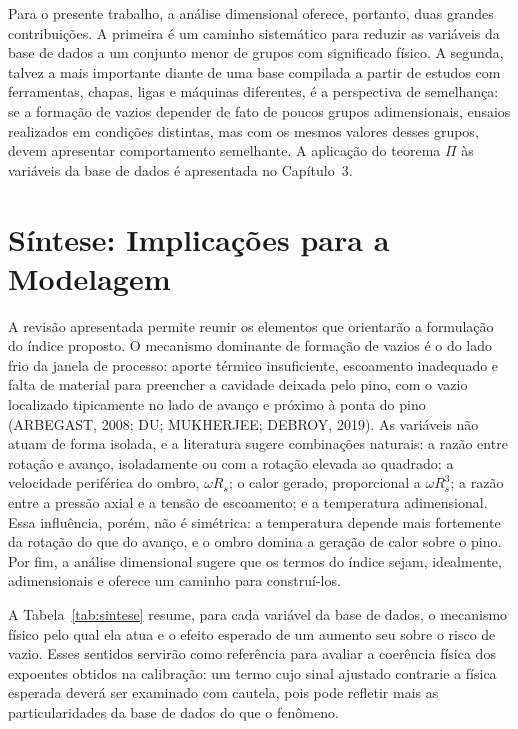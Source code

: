 \documentclass[12pt,openany]{report}
\begin{document}
Para o presente trabalho, a análise dimensional oferece, portanto, duas grandes contribuições. A primeira é um caminho sistemático para reduzir as variáveis da base de dados a um conjunto menor de grupos com significado físico. A segunda, talvez a mais importante diante de uma base compilada a partir de estudos com ferramentas, chapas, ligas e máquinas diferentes, é a perspectiva de semelhança: se a formação de vazios depender de fato de poucos grupos adimensionais, ensaios realizados em condições distintas, mas com os mesmos valores desses grupos, devem apresentar comportamento semelhante. A aplicação do teorema $\Pi$ às variáveis da base de dados é apresentada no Capítulo~3.

\section{Síntese: Implicações para a Modelagem}
\label{sec:sintese}

A revisão apresentada permite reunir os elementos que orientarão a formulação do índice proposto. O mecanismo dominante de formação de vazios é o do lado frio da janela de processo: aporte térmico insuficiente, escoamento inadequado e falta de material para preencher a cavidade deixada pelo pino, com o vazio localizado tipicamente no lado de avanço e próximo à ponta do pino (ARBEGAST, 2008; DU; MUKHERJEE; DEBROY, 2019). As variáveis não atuam de forma isolada, e a literatura sugere combinações naturais: a razão entre rotação e avanço, isoladamente ou com a rotação elevada ao quadrado; a velocidade periférica do ombro, $\omega R_s$; o calor gerado, proporcional a $\omega R_{s}^{3}$; a razão entre a pressão axial e a tensão de escoamento; e a temperatura adimensional. Essa influência, porém, não é simétrica: a temperatura depende mais fortemente da rotação do que do avanço, e o ombro domina a geração de calor sobre o pino. Por fim, a análise dimensional sugere que os termos do índice sejam, idealmente, adimensionais e oferece um caminho para construí-los.

A Tabela~\ref{tab:sintese} resume, para cada variável da base de dados, o mecanismo físico pelo qual ela atua e o efeito esperado de um aumento seu sobre o risco de vazio. Esses sentidos servirão como referência para avaliar a coerência física dos expoentes obtidos na calibração: um termo cujo sinal ajustado contrarie a física esperada deverá ser examinado com cautela, pois pode refletir mais as particularidades da base de dados do que o fenômeno.
\end{document}
